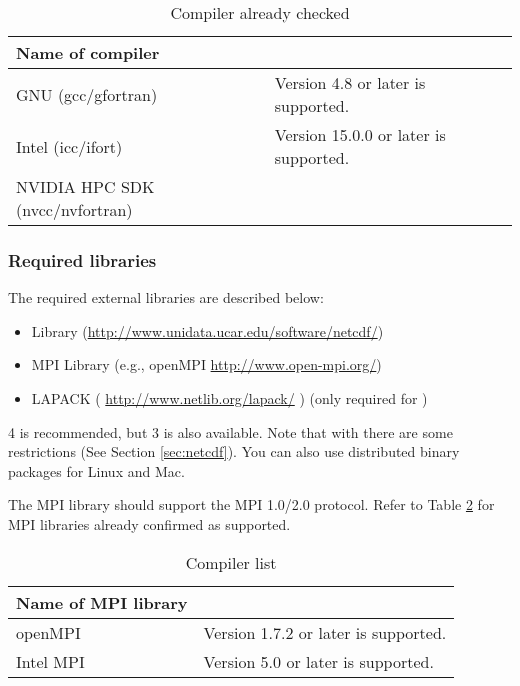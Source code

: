 \begin{table}[tb]
\begin{center}
\caption{Compiler already checked}
\begin{tabularx}{150mm}{|l|X|} \hline
 \rowcolor[gray]{0.9} Name of compiler &  \\ \hline
  GNU (gcc/gfortran)    & Version 4.8 or later is supported. \\ \hline
  Intel (icc/ifort)     & Version 15.0.0 or later is supported. \\ \hline
  NVIDIA HPC SDK (nvcc/nvfortran) &  \\ \hline
\end{tabularx}
\label{tab:compatible_compiler}
\end{center}
\end{table}



\subsubsection{Required libraries}\label{sec:inst_env}

The required external libraries are described below:
\begin{itemize}
\item {\netcdf} Library (\url{http://www.unidata.ucar.edu/software/netcdf/})
\item MPI Library (e.g., openMPI \url{http://www.open-mpi.org/})
\item LAPACK ( \url{http://www.netlib.org/lapack/} ) (only required for \scalegm)
\end{itemize}

{\netcdf}4 is recommended, but {\netcdf}3 is also available.
Note that with  there are some restrictions (See Section \ref{sec:netcdf}).
You can also use distributed binary packages for Linux and Mac.

The MPI library should support the MPI 1.0/2.0 protocol.  Refer to Table \ref{tab:compatible_mpi} for MPI libraries already confirmed as supported.

\begin{table}[tb]
\begin{center}
\caption{Compiler list}
\begin{tabularx}{150mm}{|l|X|} \hline
 \rowcolor[gray]{0.9} Name of MPI library &  \\ \hline
  openMPI               & Version 1.7.2 or later is supported. \\ \hline
  Intel MPI             & Version 5.0 or later is supported.\\ \hline
\end{tabularx}
\label{tab:compatible_mpi}
\end{center}
\end{table}


